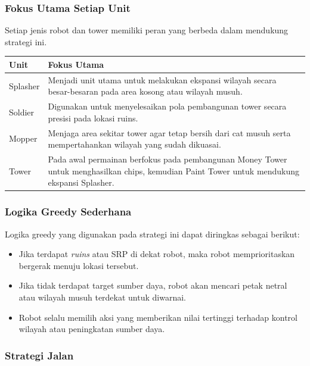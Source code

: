\documentclass{article}
\begin{document}
\subsubsection{Fokus Utama Setiap Unit}

Setiap jenis robot dan tower memiliki peran yang berbeda dalam mendukung strategi ini.

\begin{table}[H]
\centering
\begin{tabular}{|p{4cm}|p{10cm}|}
\hline
\textbf{Unit} & \textbf{Fokus Utama} \\
\hline
Splasher & Menjadi unit utama untuk melakukan ekspansi wilayah secara besar-besaran pada area kosong atau wilayah musuh. \\
\hline
Soldier & Digunakan untuk menyelesaikan pola pembangunan tower secara presisi pada lokasi ruins. \\
\hline
Mopper & Menjaga area sekitar tower agar tetap bersih dari cat musuh serta mempertahankan wilayah yang sudah dikuasai. \\
\hline
Tower & Pada awal permainan berfokus pada pembangunan Money Tower untuk menghasilkan chips, kemudian Paint Tower untuk mendukung ekspansi Splasher. \\
\hline
\end{tabular}
\end{table}

\subsubsection{Logika Greedy Sederhana}

Logika greedy yang digunakan pada strategi ini dapat diringkas sebagai berikut:

\begin{itemize}
\item Jika terdapat \textit{ruins} atau SRP di dekat robot, maka robot memprioritaskan bergerak menuju lokasi tersebut.
\item Jika tidak terdapat target sumber daya, robot akan mencari petak netral atau wilayah musuh terdekat untuk diwarnai.
\item Robot selalu memilih aksi yang memberikan nilai tertinggi terhadap kontrol wilayah atau peningkatan sumber daya.
\end{itemize}

\subsubsection{Strategi Jalan}
\end{document}
